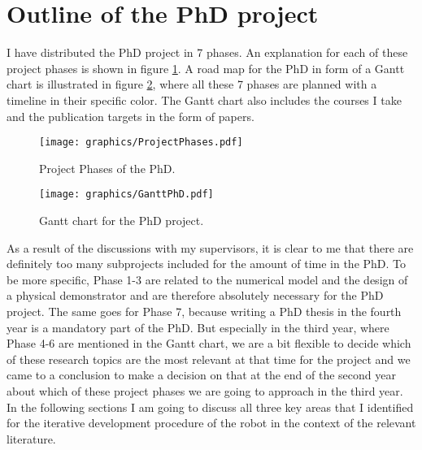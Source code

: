 \section{Outline of the PhD project} \label{sec:outline}
%
I have distributed the PhD project in 7 phases. An explanation for each of these project phases is shown in figure \ref{ProjectPhases}. A road map for the PhD in form of a Gantt
chart is illustrated in figure \ref{GanttPhD}, where all these 7 phases are planned with a timeline in their specific color. The Gantt chart also includes the courses I take
 and the publication targets in the form of papers. 
%
\begin{figure}[ht]
    \centering
    \texttt{[image: graphics/ProjectPhases.pdf]}
    \caption{Project Phases of the PhD.}
    \label{ProjectPhases}
   \end{figure}
%
\begin{figure}[ht]
    \centering
    \texttt{[image: graphics/GanttPhD.pdf]}
    \caption{Gantt chart for the PhD project.}
    \label{GanttPhD}
   \end{figure}   
%
As a result of the discussions with my supervisors, it is clear to me that there are definitely too many subprojects included for the amount of time in the PhD.
To be more specific, Phase 1-3 are related to the numerical model and the design of a physical demonstrator and are therefore absolutely necessary for the PhD project. 
The same goes for Phase 7, because writing a PhD thesis in the fourth year is a mandatory part of the PhD. But especially in the third year, where Phase 4-6 are mentioned
in the Gantt chart, we are a bit flexible to decide which of these research topics are the most relevant at that time for the project and we came to a conclusion to make a decision
on that at the end of the second year about which of these project phases we are going to approach in the third year. 
%
In the following sections I am going to discuss all three key areas that I identified for the iterative development procedure of the robot in the context of the relevant literature.
%
%
